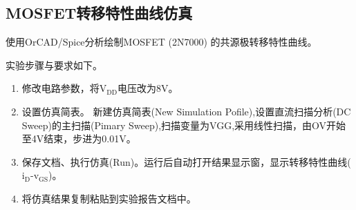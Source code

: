 \documentclass[a4paper]{article}
\theoremstyle{definition}
\theoremstyle{plain}
\theoremstyle{remark}
\begin{document}
\subsection{MOSFET转移特性曲线仿真}
使用OrCAD/Spice分析绘制MOSFET (2N7000) 的共源极转移特性曲线。

实验步骤与要求如下。
\begin{enumerate}
	\item 修改电路参数，将$\mathrm{V_{DD}}$电压改为8V。
	\item 设置仿真简表。
	      新建仿真简表(New Simulation Pofile),设置直流扫描分析(DC Sweep)的主扫描(Pimary Sweep),扫描变量为VGG,采用线性扫描，由OV开始至4V结束，步进为0.01V。
	\item 保存文档、执行仿真(Run)。运行后自动打开结果显示窗，显示转移特性曲线($\mathrm{i_D}$-$\mathrm{v_{GS}}$)。
	\item 将仿真结果复制粘贴到实验报告文档中。
\end{enumerate}
\end{document}
